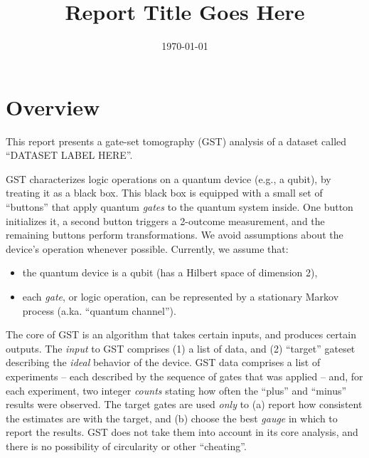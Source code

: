 \documentclass{article}[11pt]
\newcommand{\putfield}[2]{#2}
\begin{document}
\title{\putfield{title}{Report Title Goes Here}}
\date{\vspace{-1cm}\today}

\begingroup
\let\center\flushleft
\let\endcenter\endflushleft
\maketitle
\endgroup

\section{Overview}
This report presents a gate-set tomography (GST) analysis of a dataset called ``\putfield{datasetLabel}{DATASET LABEL HERE}''.  

GST characterizes logic operations on a quantum device (e.g., a qubit), by treating it as a black box.  This black box is equipped with a small set of ``buttons'' that apply quantum \emph{gates} to the quantum system inside.  One button initializes it, a second button triggers a 2-outcome measurement, and the remaining buttons perform transformations.  We avoid assumptions about the device's operation whenever possible.  Currently, we assume that:
\begin{itemize}
\item the quantum device is a qubit (has a Hilbert space of dimension 2),
\item each \emph{gate}, or logic operation, can be represented by a stationary Markov process (a.ka. ``quantum channel'').
\end{itemize}
The core of GST is an algorithm that takes certain inputs, and produces certain outputs.  The \emph{input} to GST comprises (1) a list of data, and (2) ``target'' gateset describing the \emph{ideal} behavior of the device.  GST data comprises a list of experiments -- each described by the sequence of gates that was applied -- and, for each experiment, two integer \emph{counts} stating how often the ``plus'' and ``minus'' results were observed.  The target gates are used \emph{only} to (a) report how consistent the estimates are with the target, and (b) choose the best \emph{gauge} in which to report the results.  GST does not take them into account in its core analysis, and there is no possibility of circularity or other ``cheating''.
\end{document}
